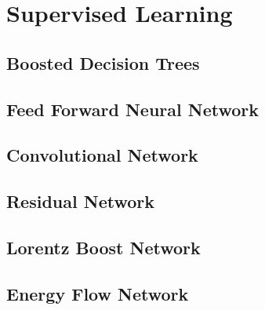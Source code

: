 \section{Supervised Learning}
\label{sec:supervised}

\subsection{Boosted Decision Trees}


\subsection{Feed Forward Neural Network}


\subsection{Convolutional Network}


\subsection{Residual Network}

\subsection{Lorentz Boost Network}


\subsection{Energy Flow Network}

